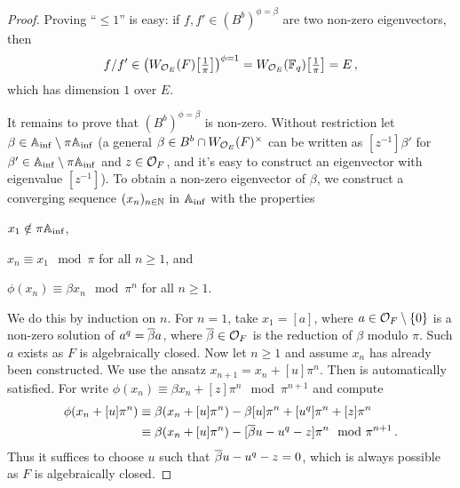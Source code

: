 \documentclass[a4paper, 10pt, oneside, DIV=9, chapterprefix=true, numbers=enddot,bibliography=totoc]{scrbook}
\begin{document}
\begin{proof}
	Proving \enquote{$\leq 1$} is easy: if $f,f'\in (B^b)^{\phi=\beta}$ are two non-zero eigenvectors, then
	\begin{equation*}
		f/f'\in\left(W_{\Oo_E}(F)\localize{\pi}\right)^{\phi=1}=W_{\Oo_E}(\IF_q)\localize{\pi}=E\,,
	\end{equation*}
	which has dimension $1$ over $E$.
	
	It remains to prove that $(B^b)^{\phi=\beta}$ is non-zero. Without restriction let $\beta\in\mathbb{A}_{\mathrm{inf}}\setminus\pi\mathbb{A}_{\mathrm{inf}}$ (a general $\beta\in B^b\cap W_{\mathcal{O}_E}(F)^\times$ can be written as $[z^{-1}]\beta'$ for $\beta'\in \mathbb{A}_{\mathrm{inf}}\setminus \pi\mathbb{A}_{\mathrm{inf}}$ and $z\in \mathcal{O}_F$, and it's easy to construct an eigenvector with eigenvalue $[z^{-1}]$). To obtain a non-zero eigenvector of $\beta$, we construct a converging sequence $(x_n)_{n\in\mathbb{N}}$ in $\mathbb{A}_{\mathrm{inf}}$ with the properties
	\begin{numerate}
		\item $x_1\notin\pi\mathbb{A}_{\mathrm{inf}}$,
		\item $x_n\equiv x_1\mod \pi$ for all $n\geq 1$, and
		\item $\phi(x_n)\equiv \beta x_n\mod\pi^n$ for all $n\geq 1$.
	\end{numerate}
	We do this by induction on $n$. For $n=1$, take $x_1=[a]$, where $a\in \mathcal{O}_F\setminus\{0\}$ is a non-zero solution of $a^q=\ov{\beta }a$, where $\ov{\beta}\in \Oo_F$ is the reduction of $\beta$ modulo $\pi$. Such $a$ exists as $F$ is algebraically closed. Now let $n\geq1$ and assume $x_n$ has already been constructed. We use the ansatz $x_{n+1}=x_n+[u]\pi^n$. Then  is automatically satisfied. For  write $\phi(x_n)\equiv \beta x_n+[z]\pi^n\mod \pi^{n+1}$ and compute
	\begin{align*}
		\phi(x_n+[u]\pi^n)&\equiv \beta(x_n+[u]\pi^n)-\beta[u]\pi^n+[u^q]\pi^n+[z]\pi^n\\
		&\equiv \beta(x_n+[u]\pi^n)-[\ov{\beta}u-u^q-z]\pi^n\mod \pi^{n+1}\,.
	\end{align*}
	Thus it suffices to choose $u$ such that $\ov{\beta}u-u^q-z=0$, which is always possible as $F$ is algebraically closed.
\end{proof}

\appendix

\backmatter{}
\printbibliography
\end{document}
